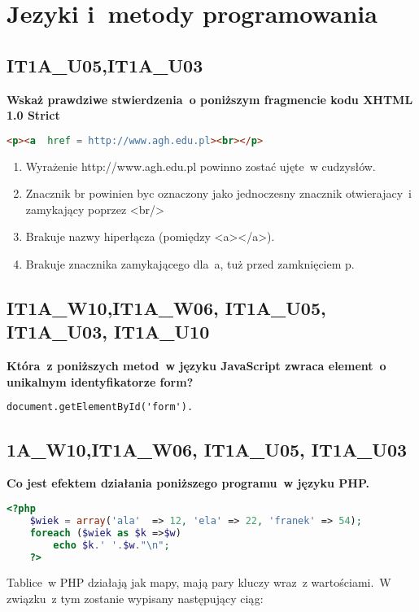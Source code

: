 \chapter{Jezyki i~metody programowania}
\PartialToc
\section{IT1A\_U05,IT1A\_U03}
\textbf{Wskaż prawdziwe stwierdzenia~o poniższym fragmencie kodu XHTML 1.0 Strict}
\begin{lstlisting}[language=html]
	<p><a  href = http://www.agh.edu.pl><br></p>
\end{lstlisting}

\vspace{0.4cm}
\noindent
\begin{enumerate}
\item Wyrażenie  http://www.agh.edu.pl  powinno zostać ujęte~w cudzysłów.  
\item   Znacznik br powinien byc oznaczony jako jednoczesny znacznik otwierajacy~i zamykający poprzez <br/>
\item Brakuje nazwy hiperłącza (pomiędzy <a></a>).
\item Brakuje znacznika zamykającego dla~a, tuż przed zamknięciem p.
\end{enumerate}


\section{IT1A\_W10,IT1A\_W06, IT1A\_U05, IT1A\_U03, IT1A\_U10}
\textbf{Która~z poniższych metod~w języku JavaScript zwraca element~o unikalnym identyfikatorze form?
 }
\begin{lstlisting}[language=html]
	document.getElementById('form').
\end{lstlisting}

\section{1A\_W10,IT1A\_W06, IT1A\_U05, IT1A\_U03}
\textbf{Co jest efektem działania poniższego programu~w języku PHP.}
\begin{lstlisting}[language=php]
	<?php
	$wiek = array('ala'  => 12, 'ela' => 22, 'franek' => 54);
	foreach ($wiek as $k =>$w)
		echo $k.' '.$w."\n";
	?>
\end{lstlisting}
\vspace{0.4cm}
\noindent
Tablice~w PHP działają jak mapy, mają pary kluczy wraz~z wartościami.~W związku~z tym zostanie wypisany następujący ciąg:

